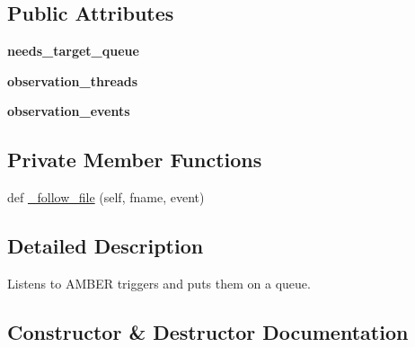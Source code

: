 \subsection*{Public Attributes}
\begin{DoxyCompactItemize}
\item 
\mbox{\label{classdarc_1_1amber__listener_1_1_a_m_b_e_r_listener_ab03c7b1cd739ab6c1ee21ce7a2100b56}} 
{\bfseries needs\+\_\+target\+\_\+queue}
\item 
\mbox{\label{classdarc_1_1amber__listener_1_1_a_m_b_e_r_listener_ae94a3136a8e410b72b3febd6bc05a383}} 
{\bfseries observation\+\_\+threads}
\item 
\mbox{\label{classdarc_1_1amber__listener_1_1_a_m_b_e_r_listener_af6170906e52ef3bb063e6286a6970df0}} 
{\bfseries observation\+\_\+events}
\end{DoxyCompactItemize}
\subsection*{Private Member Functions}
\begin{DoxyCompactItemize}
\item 
def \mbox{\hyperlink{classdarc_1_1amber__listener_1_1_a_m_b_e_r_listener_ac053428a28ddbf92400c2a4888a737ee}{\+\_\+follow\+\_\+file}} (self, fname, event)
\end{DoxyCompactItemize}


\subsection{Detailed Description}
\begin{DoxyVerb}Listens to AMBER triggers and puts them on a queue.
\end{DoxyVerb}
 

\subsection{Constructor \& Destructor Documentation}
\mbox{\label{classdarc_1_1amber__listener_1_1_a_m_b_e_r_listener_a00dc17e121f7cc52ec1f5b455d4d1ef1}} 
